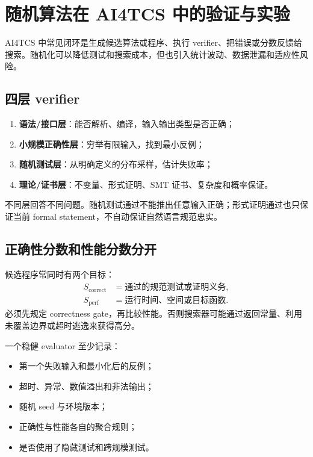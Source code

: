 \chapter{随机算法在 AI4TCS 中的验证与实验}

AI4TCS 中常见闭环是生成候选算法或程序、执行 verifier、把错误或分数反馈给搜索。随机化可以降低测试和搜索成本，但也引入统计波动、数据泄漏和适应性风险。

\section{四层 verifier}

\begin{enumerate}
  \item \textbf{语法/接口层}：能否解析、编译，输入输出类型是否正确；
  \item \textbf{小规模正确性层}：穷举有限输入，找到最小反例；
  \item \textbf{随机测试层}：从明确定义的分布采样，估计失败率；
  \item \textbf{理论/证书层}：不变量、形式证明、SMT 证书、复杂度和概率保证。
\end{enumerate}
不同层回答不同问题。随机测试通过不能推出任意输入正确；形式证明通过也只保证当前 formal statement，不自动保证自然语言规范忠实。

\section{正确性分数和性能分数分开}

候选程序常同时有两个目标：
\begin{align*}
S_{\mathrm{correct}}&=\text{通过的规范测试或证明义务},\\
S_{\mathrm{perf}}&=\text{运行时间、空间或目标函数}.
\end{align*}
必须先规定 correctness gate，再比较性能。否则搜索器可能通过返回常量、利用未覆盖边界或超时逃逸来获得高分。

一个稳健 evaluator 至少记录：
\begin{itemize}
  \item 第一个失败输入和最小化后的反例；
  \item 超时、异常、数值溢出和非法输出；
  \item 随机 seed 与环境版本；
  \item 正确性与性能各自的聚合规则；
  \item 是否使用了隐藏测试和跨规模测试。
\end{itemize}

